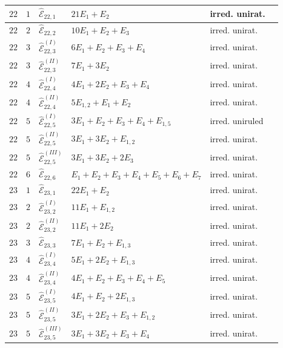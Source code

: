 \documentclass[11pt]{amsart}
\theoremstyle{definition}
\def\E{{\mathcal E}}
\begin{document}
\begin{minipage}[t]{\textwidth/2-1mm}
{\begin{tabular}{ |l | l |l|l|l|l|}
$22$ & $1$ & $\widehat{\E}_{22,1}$ & $21E_1+E_2$ & irred. unirat. \\\hline
$22$ & $2$ & $\widehat{\E}_{22,2}$ & $10E_1+E_2+E_3$ & irred. unirat. \\\hline
$22$ & $3$ & $\widehat{\E}_{22,3}^{(I)}$ & $6E_1+E_2+E_3+E_4$ & irred. unirat. \\
$22$ & $3$ & $\widehat{\E}_{22,3}^{(II)}$ & $7E_1+3E_2$ & irred. unirat. \\\hline

$22$ & $4$ & $\widehat{\E}_{22,4}^{(I)}$ & $4E_1+2E_2+E_3+E_4$ & irred. unirat.\\
$22$ & $4$ & $\widehat{\E}_{22,4}^{(II)}$ & $5E_{1,2}+E_1+E_2$  & irred. unirat.\\\hline 


$22$ & $5$ & $\widehat{\E}_{22,5}^{(I)}$ & $3E_1+E_2+E_3+E_4+E_{1,5}$ & irred. uniruled \\
$22$ & $5$ & $\widehat{\E}_{22,5}^{(II)}$ & $3E_1+3E_2+E_{1,2}$  & irred. unirat.\\
$22$ & $5$ & $\widehat{\E}_{22,5}^{(III)}$ & $3E_1+3E_2+2E_3$  & irred. unirat.\\\hline 
$22$ & $6$ & $\widehat{\E}_{22,6}$ & $E_1+E_2+E_3+E_4+E_5+E_6+E_7$  & irred. unirat.\\\hline\hline

$23$ & $1$ & $\widehat{\E}_{23,1}$ & $22E_1+E_2$ & irred. unirat. \\\hline
$23$ & $2$ & $\widehat{\E}_{23,2}^{(I)}$ & $11E_1+E_{1,2}$ & irred. unirat. \\
$23$ & $2$ & $\widehat{\E}_{23,2}^{(II)}$ & $11E_1+2E_2$ & irred. unirat.  \\\hline
$23$ & $3$ & $\widehat{\E}_{23,3}$ & $7E_1+E_2+E_{1,3}$ & irred. unirat.\\ \hline 

$23$ & $4$ & $\widehat{\E}_{23,4}^{(I)}$ & $5E_1+2E_2+E_{1,3}$ & irred. unirat.\\
$23$ & $4$ & $\widehat{\E}_{23,4}^{(II)}$ & $4E_1+E_2+E_3+E_4+E_5$ & irred. unirat.\\\hline 

$23$ & $5$ & $\widehat{\E}_{23,5}^{(I)}$ & $4E_1+E_2+2E_{1,3}$ & irred. unirat.  \\
$23$ & $5$ & $\widehat{\E}_{23,5}^{(II)}$ & $3E_{1}+2E_2+E_3+E_{1,2}$  & irred. unirat. \\
$23$ & $5$ & $\widehat{\E}_{23,5}^{(III)}$ & $3E_{1}+3E_2+E_3+E_4$  & irred. unirat.
\\\hline 


\end{tabular}}
\end{minipage}
\end{document}
